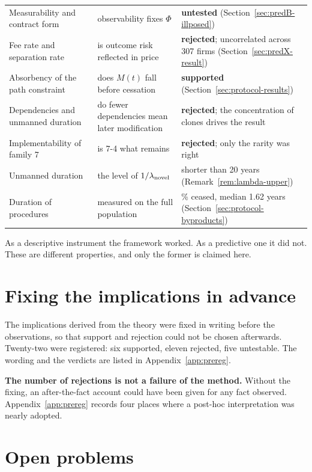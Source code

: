 \begin{longtable}{@{}>{\raggedright\arraybackslash}p{}>{\raggedright\arraybackslash}p{}>{\raggedright\arraybackslash}p{}@{}}
Measurability and contract form & observability fixes $\Phi$ & \textbf{untested} (Section~\ref{sec:predB-illposed}) \\
Fee rate and separation rate & is outcome risk reflected in price & \textbf{rejected}; uncorrelated across 307 firms (Section~\ref{sec:predX-result}) \\
Absorbency of the path constraint & does $M(t)$ fall before cessation & \textbf{supported} (Section~\ref{sec:protocol-results}) \\
Dependencies and unmanned duration & do fewer dependencies mean later modification & \textbf{rejected}; the concentration of clones drives the result \\
Implementability of family 7 & is 7-4 what remains & \textbf{rejected}; only the rarity was right \\
\midrule
Unmanned duration & the level of $1/\lambda_{\rm novel}$ & shorter than 20 years (Remark~\ref{rem:lambda-upper}) \\
Duration of procedures & measured on the full population & 8.3\% ceased, median 1.62 years (Section~\ref{sec:protocol-byproducts}) \\
\end{longtable}

As a descriptive instrument the framework worked. As a predictive one it did not. These are
different properties, and only the former is claimed here.

\section{Fixing the implications in advance}
\label{sec:prereg-worked}

The implications derived from the theory were fixed in writing before the observations, so
that support and rejection could not be chosen afterwards. Twenty-two were registered: six
supported, eleven rejected, five untestable. The wording and the verdicts are listed in
Appendix~\ref{app:prereg}.

\textbf{The number of rejections is not a failure of the method.} Without the fixing, an
after-the-fact account could have been given for any fact observed. Appendix~\ref{app:prereg}
records four places where a post-hoc interpretation was nearly adopted.

\section{Open problems}

